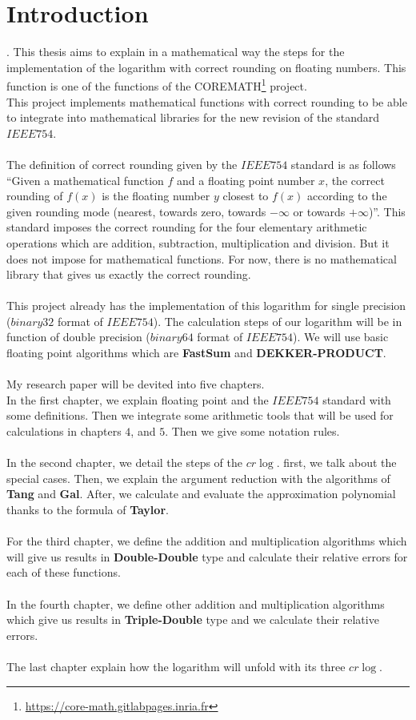 \chapter*{Introduction}
.
This thesis aims to explain in a mathematical way the steps for the implementation of the logarithm with correct rounding on floating numbers.
This function is one of the functions of the COREMATH\footnote{\url{https://core-math.gitlabpages.inria.fr}} project. \\
This project implements mathematical functions with correct rounding to be able to integrate into mathematical libraries for the new revision of the
standard $IEEE 754$.\\
\ \\
The definition of correct rounding given by the $IEEE 754$ standard is as follows \enquote{Given a mathematical function $f$ and a floating point number $x$,
the correct rounding of $f(x)$ is the floating number $y$ closest to $f(x)$ according to the given rounding mode (nearest, towards zero, towards $-\infty$ or towards
$+\infty$)}. This standard imposes the correct rounding for the four elementary arithmetic operations which are addition, subtraction,
multiplication and division. But it does not impose for mathematical functions. For now, there is no mathematical library that gives us
exactly the correct rounding.\\
\ \\
This project already has the implementation of this logarithm for single precision ($binary32$ format of $ IEEE 754$). The calculation steps of our logarithm will be in
function of double precision ($binary64$ format of $IEEE 754$). We will use basic floating point algorithms which are \textbf{FastSum} and
\textbf{DEKKER-PRODUCT}. \\
\ \\
My research paper will be devited into five chapters. \\
In the first chapter, we explain floating point and the $IEEE754$ standard with some definitions. Then we integrate some arithmetic tools that will be used for calculations in chapters $4$, and $5$. Then we give some notation rules.\\
\ \\
In the second chapter, we detail the steps of the $cr\log$. first, we talk about the special cases. Then, we explain the argument reduction with the
algorithms of \textbf{Tang} and \textbf{Gal}. After, we calculate and evaluate the approximation polynomial thanks to the formula of \textbf{Taylor}.\\
\ \\
For the third chapter, we define the addition and multiplication algorithms which will give us results in \textbf{Double-Double} type and
calculate their relative errors for each of these functions.\\
\ \\
In the fourth chapter, we define other addition and multiplication algorithms which give us results in \textbf{Triple-Double} type and
we calculate their relative errors.\\
\ \\
The last chapter explain how the logarithm will unfold with its three $cr\log$.